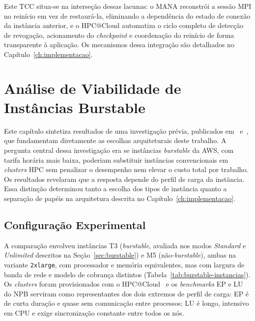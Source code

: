 Este TCC situa-se na interseção dessas lacunas: o MANA reconstrói a sessão MPI
no reinício em vez de restaurá-la, eliminando a dependência do estado de
conexão da instância anterior, e
o HPC@Cloud automatiza o ciclo completo de detecção de revogação, acionamento
do \textit{checkpoint} e coordenação do reinício de forma transparente à
aplicação. Os mecanismos dessa integração são detalhados no
Capítulo~\ref{ch:implementacao}.


\chapter{Análise de Viabilidade de Instâncias Burstable}
\label{ch:burstable}

Este capítulo sintetiza resultados de uma investigação prévia, publicados
em~\cite{soda2025erad} e~\cite{soda2025wcc}, que fundamentam diretamente as escolhas
arquiteturais deste trabalho. A pergunta central dessa investigação era se instâncias
\textit{burstable} da AWS, com tarifa horária mais baixa, poderiam substituir instâncias
convencionais em \textit{clusters} HPC sem penalizar o desempenho nem elevar o custo total
por trabalho. Os resultados revelaram que a resposta depende do perfil de carga da instância.
Essa distinção determinou tanto a escolha dos tipos de instância quanto a separação de papéis
na arquitetura descrita no Capítulo~\ref{ch:implementacao}.

\section{Configuração Experimental}
\label{sec:burstable-config}

A comparação envolveu instâncias T3 (\textit{burstable}, avaliada nos modos
\textit{Standard} e \textit{Unlimited} descritos na Seção~\ref{sec:burstable}) e M5
(não-\textit{burstable}), ambas na variante \texttt{2xlarge}, com processador e
memória equivalentes, mas com largura de banda
de rede e modelo de cobrança distintos (Tabela~\ref{tab:burstable-instancias}). Os \textit{clusters}
foram provisionados com o HPC@Cloud~\cite{munhoz2024hpccloud} e os \textit{benchmarks} EP e LU do NPB
serviram como representantes dos dois extremos de perfil de carga: EP é de curta duração e
quase sem comunicação entre processos; LU é longo, intensivo em CPU e exige sincronização
constante entre todos os nós.


